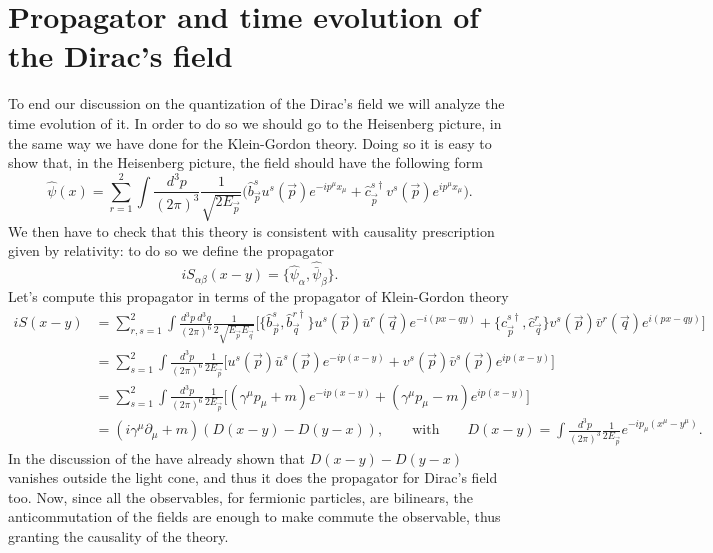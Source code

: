 \section{Propagator and time evolution of the Dirac's field}
To end our discussion on the quantization of the Dirac's field we will analyze the time evolution of it. In order to do so we should go to the Heisenberg picture, in the same way we have done for the Klein-Gordon theory. Doing so it is easy to show that, in the Heisenberg picture, the field should have the following form\begin{equation*}
    \hat{\psi}(x)=\sum_{r=1}^{2}\int \frac{d^3p}{(2\pi)^3}\frac{1}{\sqrt{2E_{\vec p}}}\bigg(\hat{b}^{s}_{\vec p}u^s(\vec p)e^{-ip^\mu x_\mu}+\hat{c}^{s\dagger}_{\vec p}v^s(\vec p)e^{ip^\mu x_\mu}\bigg).
\end{equation*} 
We then have to check that this theory is consistent with causality prescription given by relativity: to do so we define the propagator
\begin{equation*}
    iS_{\alpha\beta}(x-y)=\{\hat{\psi}_\alpha,\hat{\bar\psi}_\beta\}.
\end{equation*}
Let's compute this propagator in terms of the propagator of Klein-Gordon theory
\begin{align*}
    iS(x-y)&=\sum_{r,s=1}^{2}\int\frac{d^3p\ d^3q}{(2\pi)^6}\frac{1}{2\sqrt{E_{\vec p}E_{\vec q}}}\bigg[\{\hat{b}^{s}_{\vec p},\hat{b}^{r\dagger}_{\vec q}\}u^s(\vec p)\bar{u}^r(\vec q)e^{-i(px-qy)}+\{\hat{c}^{s\dagger}_{\vec p},\hat{c}^{r}_{\vec q}\}v^s(\vec p)\bar{v}^r(\vec q)e^{i(px-qy)}\bigg]\\&=\sum_{s=1}^{2}\int\frac{d^3p}{(2\pi)^6}\frac{1}{2E_{\vec p}}\bigg[u^s(\vec p)\bar{u}^s(\vec p)e^{-ip(x-y)}+v^s(\vec p)\bar{v}^s(\vec p)e^{ip(x-y)}\bigg]\\&=\sum_{s=1}^{2}\int\frac{d^3p}{(2\pi)^6}\frac{1}{2E_{\vec p}}\bigg[(\gamma^\mu p_\mu+m)e^{-ip(x-y)}+(\gamma^\mu p_\mu-m)e^{ip(x-y)}\bigg]\\
    &=(i\gamma^\mu\partial_\mu+m)(D(x-y)-D(y-x)),\qquad\text{with}\qquad D(x-y)=\int\frac{d^3p}{(2\pi)^3}\frac{1}{2E_{\vec p}}e^{-ip_\mu(x^\mu-y^\mu)}.
\end{align*}
In the discussion of the  have already shown that $D(x-y)-D(y-x)$ vanishes outside the light cone, and thus it does the propagator for Dirac's field too. Now, since all the observables, for fermionic particles, are bilinears, the anticommutation of the fields are enough to make commute the observable, thus granting the causality of the theory.\\

